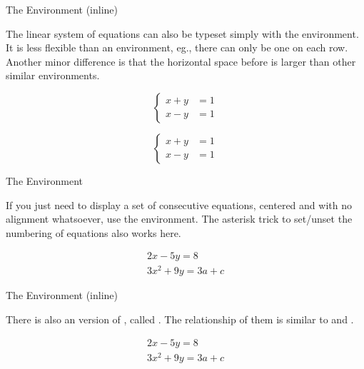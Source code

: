 \begin{frame}[fragile]{The  Environment (inline)}

The linear system of equations can also be typeset simply with the  environment. It is less flexible than an  environment, eg., there can only be one \LC{&} on each row. Another minor difference is that the horizontal space before  \LC{&} is larger than other similar environments.

\begin{latexexamplesplit}
\begin{equation}
  \left\lbrace\begin{aligned}
    x+y &= 1 \\ 
    x-y &= 1
  \end{aligned}\right.
\end{equation}

\begin{equation}
  \begin{cases} 
    x+y &= 1 \\ 
    x-y &= 1
  \end{cases}
\end{equation}
\end{latexexamplesplit}

\end{frame}


\begin{frame}[fragile]{The  Environment}

If you just need to display a set of consecutive equations, centered and with no alignment whatsoever, use the  environment. The asterisk trick to set/unset the numbering of equations also works here.

\begin{latexexamplesplit}
\begin{gather} 
  2x - 5y =  8 \\ 
  3x^2 + 9y =  3a + c
\end{gather}
\end{latexexamplesplit}

\end{frame}

\begin{frame}[fragile]{The  Environment (inline) }

There is also an  version of , called . The relationship of them is similar to  and .

\begin{latexexamplesplit}
\begin{equation} 
  \begin{gathered} 
    2x - 5y =  8 \\ 
    3x^2 + 9y =  3a + c
  \end{gathered}
\end{equation}
\end{latexexamplesplit}

\end{frame}


